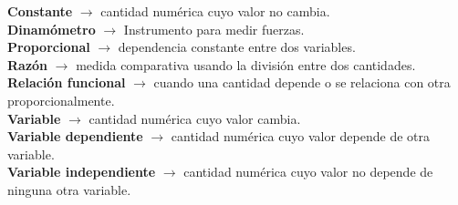 \begin{defcard}
    \textbf{Constante} $\rightarrow$ cantidad numérica cuyo valor no cambia.\\
    \textbf{Dinamómetro} $\rightarrow$ Instrumento para medir fuerzas.\\
    \textbf{Proporcional} $\rightarrow$ dependencia constante entre dos variables.\\
    \textbf{Razón} $\rightarrow$ medida comparativa usando la división entre dos cantidades.\\
    \textbf{Relación funcional} $\rightarrow$ cuando una cantidad depende o se relaciona con otra proporcionalmente.\\
    \textbf{Variable} $\rightarrow$ cantidad numérica cuyo valor cambia.\\
    \textbf{Variable dependiente} $\rightarrow$ cantidad numérica cuyo valor depende de otra variable.\\
    \textbf{Variable independiente} $\rightarrow$ cantidad numérica cuyo valor no depende de ninguna otra variable.\\
\end{defcard}